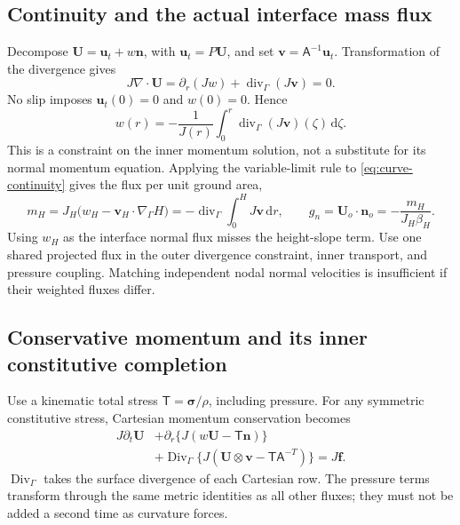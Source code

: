 \documentclass[11pt,a4paper]{article}
\numberwithin{equation}{section}
\newcommand{\dd}{\mathrm{d}}
\begin{document}
\subsection{Continuity and the actual interface mass flux}
Decompose $\bm U=\bm u_t+w\bm n$, with $\bm u_t=P\bm U$, and set
$\bm v=\mathsf A^{-1}\bm u_t$. Transformation of the divergence gives
\begin{equation}
 \boxed{J\nabla\cdot\bm U
 =\partial_r(Jw)+\operatorname{div}_\Gamma(J\bm v)=0.}
 \label{eq:curve-continuity}
\end{equation}
No slip imposes $\bm u_t(0)=0$ and $w(0)=0$. Hence
\begin{equation}
 w(r)=-\frac1{J(r)}\int_0^r
       \operatorname{div}_\Gamma(J\bm v)(\zeta)\,\dd\zeta.
 \label{eq:curve-w}
\end{equation}
This is a constraint on the inner momentum solution, not a substitute
for its normal momentum equation. Applying the variable-limit rule to
\cref{eq:curve-continuity} gives the flux per unit ground area,
\begin{equation}
 \boxed{m_H=J_H\bigl(w_H-\bm v_H\cdot\nabla_\Gamma H\bigr)
 =-\operatorname{div}_\Gamma\int_0^H J\bm v\,\dd r,\qquad
 g_n=\bm U_o\cdot\bm n_o=-\frac{m_H}{J_H\beta_H}.}
 \label{eq:curve-massflux}
\end{equation}
Using $w_H$ as the interface normal flux misses the height-slope term.
Use one shared projected flux in the outer divergence constraint,
inner transport, and pressure coupling. Matching independent nodal
normal velocities is insufficient if their weighted fluxes differ.

\subsection{Conservative momentum and its inner constitutive completion}
Use a kinematic total stress $\mathsf T=\boldsymbol\sigma/\rho$,
including pressure. For any symmetric constitutive stress, Cartesian
momentum conservation becomes
\begin{equation}
 \boxed{\begin{aligned}
 J\partial_t\bm U
 &+\partial_r\{J(w\bm U-\mathsf T\bm n)\}\\
 &+\operatorname{Div}_\Gamma
       \{J(\bm U\otimes\bm v-\mathsf T \mathsf A^{-T})\}
 =J\bm f.
 \end{aligned}}
 \label{eq:curve-momentum}
\end{equation}
$\operatorname{Div}_\Gamma$ takes the surface divergence of each
Cartesian row. The pressure terms transform through the same metric
identities as all other fluxes; they must not be added a second time
as curvature forces.
\end{document}
